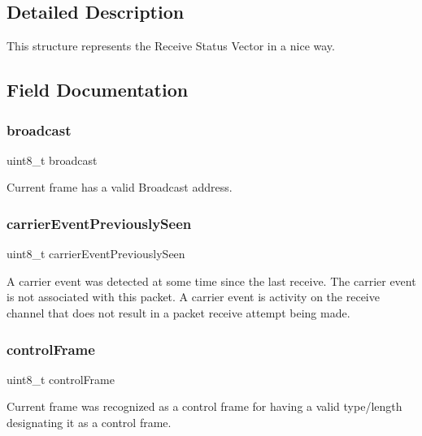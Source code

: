 \subsection{Detailed Description}
This structure represents the Receive Status Vector in a nice way. 

\subsection{Field Documentation}
\mbox{\label{struct_r_s_v_a6e3870c14f08dc47009ee5358a0f06bb}} 
\subsubsection{\texorpdfstring{broadcast}{broadcast}}
{\footnotesize\ttfamily uint8\+\_\+t broadcast}



Current frame has a valid Broadcast address. 

\mbox{\label{struct_r_s_v_a009a3b631b303f95d25e18876d2bcf6c}} 
\subsubsection{\texorpdfstring{carrierEventPreviouslySeen}{carrierEventPreviouslySeen}}
{\footnotesize\ttfamily uint8\+\_\+t carrier\+Event\+Previously\+Seen}

A carrier event was detected at some time since the last receive. The carrier event is not associated with this packet. A carrier event is activity on the receive channel that does not result in a packet receive attempt being made. \mbox{\label{struct_r_s_v_aa35d3ed42d81d27aa06f55388ac07d2d}} 
\subsubsection{\texorpdfstring{controlFrame}{controlFrame}}
{\footnotesize\ttfamily uint8\+\_\+t control\+Frame}



Current frame was recognized as a control frame for having a valid type/length designating it as a control frame. 

